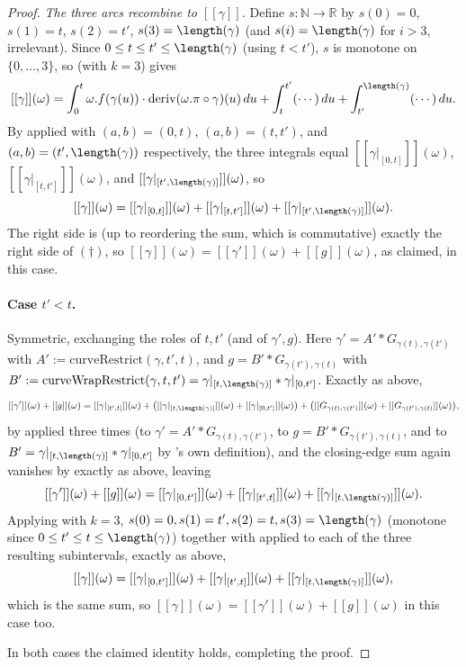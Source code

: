 \begin{proof}
  \emph{The three arcs recombine to $[[\gamma]]$.} Define $s \colon \mathbb{N} \to \mathbb{R}$ by
  $s(0)=0$, $s(1)=t$, $s(2)=t'$, $s(3)=\length(\gamma)$ (and $s(i)=\length(\gamma)$ for $i>3$,
  irrelevant). Since $0 \le t \le t' \le \length(\gamma)$ (using $t<t'$), $s$ is monotone on
  $\{0,\dots,3\}$, so  (with $k=3$) gives
  \[
    [[\gamma]](\omega) = \int_0^t \omega.f(\gamma(u))\cdot\mathrm{deriv}(\omega.\pi\circ\gamma)(u)\,du
      + \int_t^{t'} (\cdots)\,du + \int_{t'}^{\length(\gamma)} (\cdots)\,du
    .
  \]
  By  applied with $(a,b)=(0,t)$, $(a,b)=(t,t')$, and
  $(a,b)=(t',\length(\gamma))$ respectively, the three integrals equal
  $[[\gamma|_{[0,t]}]](\omega)$, $[[\gamma|_{[t,t']}]](\omega)$, and
  $[[\gamma|_{[t',\length(\gamma)]}]](\omega)$, so
  \[
    [[\gamma]](\omega) = [[\gamma|_{[0,t]}]](\omega) + [[\gamma|_{[t,t']}]](\omega) +
      [[\gamma|_{[t',\length(\gamma)]}]](\omega)
    .
  \]
  The right side is (up to reordering the sum, which is commutative) exactly the right side of
  $(\dagger)$, so $[[\gamma]](\omega) = [[\gamma']](\omega)+[[g]](\omega)$, as claimed, in this case.

  \paragraph{Case $t' < t$.} Symmetric, exchanging the roles of $t,t'$ (and of $\gamma',g$). Here
  $\gamma' = A' * G_{\gamma(t),\gamma(t')}$ with $A' := \mathrm{curveRestrict}(\gamma,t',t)$, and
  $g = B' * G_{\gamma(t'),\gamma(t)}$ with $B' := \mathrm{curveWrapRestrict}(\gamma,t,t') =
  \gamma|_{[t,\length(\gamma)]} * \gamma|_{[0,t']}$. Exactly as above,
  \[
    [[\gamma']](\omega) + [[g]](\omega) = [[\gamma|_{[t',t]}]](\omega) +
      \bigl([[\gamma|_{[t,\length(\gamma)]}]](\omega) + [[\gamma|_{[0,t']}]](\omega)\bigr) +
      \bigl([[G_{\gamma(t),\gamma(t')}]](\omega)+[[G_{\gamma(t'),\gamma(t)}]](\omega)\bigr)
    ,
  \]
  by  applied three times (to $\gamma'=A'*G_{\gamma(t),\gamma(t')}$,
  to $g = B'*G_{\gamma(t'),\gamma(t)}$, and to $B' = \gamma|_{[t,\length(\gamma)]}*\gamma|_{[0,t']}$
  by 's own definition), and the closing-edge sum again vanishes by
   exactly as above, leaving
  \[
    [[\gamma']](\omega) + [[g]](\omega) = [[\gamma|_{[0,t']}]](\omega) + [[\gamma|_{[t',t]}]](\omega)
      + [[\gamma|_{[t,\length(\gamma)]}]](\omega)
    .
  \]
  Applying  with $k=3$, $s(0)=0,s(1)=t',s(2)=t,s(3)=\length(\gamma)$
  (monotone since $0\le t' \le t \le \length(\gamma)$) together with 
  applied to each of the three resulting subintervals, exactly as above,
  \[
    [[\gamma]](\omega) = [[\gamma|_{[0,t']}]](\omega) + [[\gamma|_{[t',t]}]](\omega) +
      [[\gamma|_{[t,\length(\gamma)]}]](\omega)
    ,
  \]
  which is the same sum, so $[[\gamma]](\omega) = [[\gamma']](\omega) + [[g]](\omega)$ in this case
  too.

  In both cases the claimed identity holds, completing the proof.
\end{proof}
